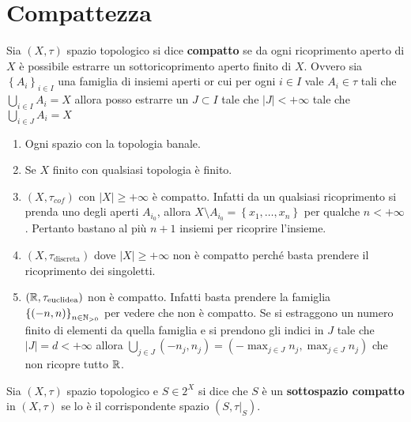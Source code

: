 \section{Compattezza}

\begin{definition}
	Sia $(X, \tau)$ spazio topologico si dice \textbf{compatto} se da ogni ricoprimento aperto di $X$ è possibile estrarre un sottoricoprimento aperto finito di $X$. Ovvero sia $\left\{A_i\right\}_{i\in I}$ una famiglia di insiemi aperti or cui per ogni $i\in I$ vale $A_i \in \tau$ tali che $\bigcup_{i \in I} A_i = X$ allora posso estrarre un $J \subset I$ tale che $|J| < +\infty$ tale che $\bigcup_{i \in J} A_i = X$
\end{definition} 

\begin{example}
\begin{enumerate}
	\item Ogni spazio con la topologia banale.
	\item Se $X$ finito con qualsiasi topologia è finito.
	\item $(X, \tau_{cof})$ con $|X| \ge +\infty$ è compatto. Infatti da un qualsiasi ricoprimento si prenda uno degli aperti $A_{i_0}$, allora $X \setminus A_{i_0} = \left\{x_1, \dots, x_n\right\}$ per qualche $n < +\infty$. Pertanto bastano al più $n+1$ insiemi per ricoprire l'insieme.
	\item $(X,\tau_{\text{discreta}})$ dove $|X| \ge +\infty$  non è compatto perché basta prendere il ricoprimento dei singoletti.
	\item $(\mathbb{R}, \tau_{\text{euclidea}})$ non è compatto. Infatti basta prendere la famiglia $\left\{(-n, n)\right\}_{n \in \mathbb{N}_{>0}}$ per vedere che non è compatto. Se si estraggono un numero finito di elementi da quella famiglia e si prendono gli indici in $J$ tale che $|J| = d < +\infty$ allora $\bigcup_{j \in J}(-n_j, n_j) = (-\max_{j \in J} n_j,  \max_{j \in J} n_j)$ che non ricopre tutto $\mathbb{R}$.
\end{enumerate}
\end{example}

\begin{definition}
	Sia $(X, \tau)$ spazio topologico e $S \in 2^X$ si dice che $S$ è un \textbf{sottospazio compatto} in $(X, \tau)$ se lo è il corrispondente spazio $(S, \tau|_S)$.
\end{definition} 

